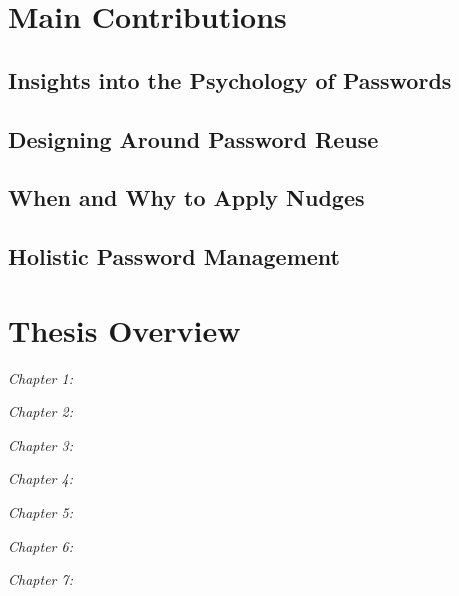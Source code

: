 \section{Main Contributions}
\subsection{Insights into the Psychology of Passwords}
\subsection{Designing Around Password Reuse}
\subsection{When and Why to Apply Nudges}
\subsection{Holistic Password Management}


\section{Thesis Overview}
\textit{Chapter 1:}

\textit{Chapter 2:}

\textit{Chapter 3:}

\textit{Chapter 4:}

\textit{Chapter 5:}

\textit{Chapter 6:}

\textit{Chapter 7:}




